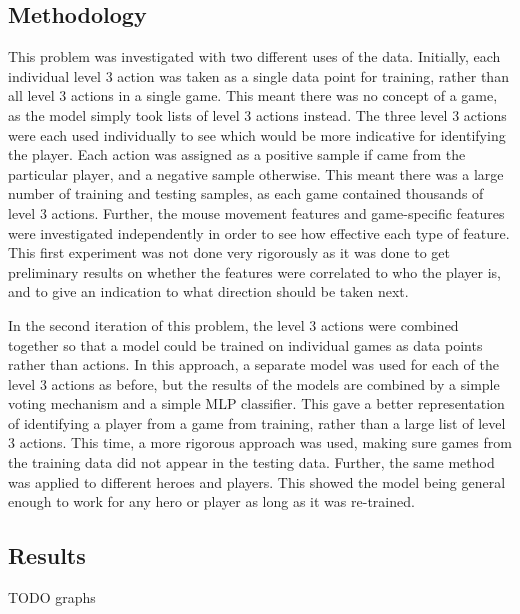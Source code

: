 \documentclass{../sty/SizheArticle}
\begin{document}
\subsection{Methodology}
This problem was investigated with two different uses of the data.  Initially, each individual level 3 action was taken as a single data point for training, rather than all level 3 actions in a single game. This meant there was no concept of a game, as the model simply took lists of level 3 actions instead. The three level 3 actions were each used individually to see which would be more indicative for identifying the player. Each action was assigned as a positive sample if came from the particular player, and a negative sample otherwise. This meant there was a large number of training and testing samples, as each game contained thousands of level 3 actions. Further, the mouse movement features and game-specific features were investigated independently in order to see how effective each type of feature. This first experiment was not done very rigorously as it was done to get preliminary results on whether the features were correlated to who the player is, and to give an indication to what direction should be taken next. 

In the second iteration of this problem, the level 3 actions were combined together so that a model could be trained on individual games as data points rather than actions. In this approach, a separate model was used for each of the level 3 actions as before, but the results of the models are combined by a simple voting mechanism and a simple MLP classifier. This gave a better representation of identifying a player from a game from training, rather than a large list of level 3 actions. This time, a more rigorous approach was used, making sure games from the training data did not appear in the testing data. Further, the same method was applied to different heroes and players. This showed the model being general enough to work for any hero or player as long as it was re-trained. 
\subsection{Results}
TODO graphs
\end{document}
